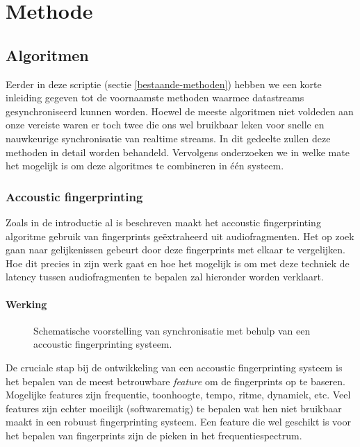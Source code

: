 \chapter{Methode}

\section{Algoritmen}

Eerder in deze scriptie (sectie \ref{bestaande-methoden}) hebben we een korte inleiding gegeven tot de voornaamste methoden waarmee datastreams gesynchroniseerd kunnen worden. Hoewel de meeste algoritmen niet voldeden aan onze vereiste waren er toch twee die ons wel bruikbaar leken voor snelle en nauwkeurige synchronisatie van realtime streams. In dit gedeelte zullen deze methoden in detail worden behandeld. Vervolgens onderzoeken we in welke mate het mogelijk is om deze algoritmes te combineren in één systeem.

\subsection{Accoustic fingerprinting}

Zoals in de introductie al is beschreven maakt het accoustic fingerprinting algoritme gebruik van fingerprints geëxtraheerd uit audiofragmenten. Het op zoek gaan naar gelijkenissen gebeurt door deze fingerprints met elkaar te vergelijken. Hoe dit precies in zijn werk gaat en hoe het mogelijk is om met deze techniek de latency tussen audiofragmenten te bepalen zal hieronder worden verklaart.

\subsubsection{Werking}
\begin{figure}[h]
	\captionsetup{width=\textwidth}
	\caption[Schema synchronisatie met fingerprinting]{Schematische voorstelling van synchronisatie met behulp van een accoustic fingerprinting systeem.}
	\advance\parskip0.5cm
	
	\advance\parskip1cm
\end{figure}
\vspace{2.5cm}

De cruciale stap bij de ontwikkeling van een accoustic fingerprinting systeem is het bepalen van de meest betrouwbare \textit{feature} om de fingerprints op te baseren. Mogelijke features zijn frequentie, toonhoogte, tempo, ritme, dynamiek, etc. Veel features zijn echter moeilijk (softwarematig) te bepalen wat hen niet bruikbaar maakt in een robuust fingerprinting systeem. Een feature die wel geschikt is voor het bepalen van fingerprints zijn de pieken in het frequentiespectrum.

